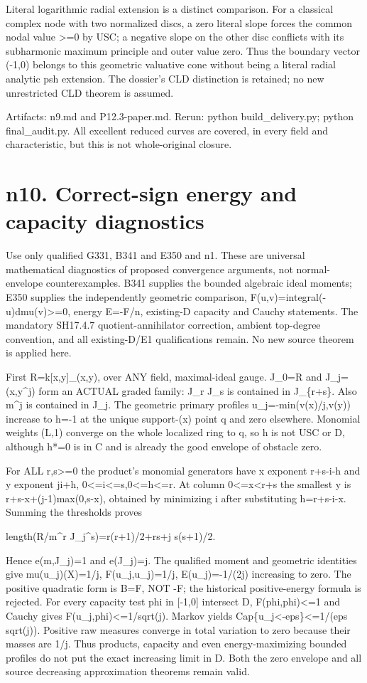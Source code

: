 \documentclass[11pt]{article}
\begin{document}
Literal logarithmic radial extension is a distinct comparison. For a classical complex node with two normalized discs, a zero literal slope forces the common nodal value >=0 by USC; a negative slope on the other disc conflicts with its subharmonic maximum principle and outer value zero. Thus the boundary vector (-1,0) belongs to this geometric valuative cone without being a literal radial analytic psh extension. The dossier's CLD distinction is retained; no new unrestricted CLD theorem is assumed.

Artifacts: n9.md and P12.3-paper.md. Rerun: python build\_delivery.py; python final\_audit.py. All excellent reduced curves are covered, in every field and characteristic, but this is not whole-original closure.


\section*{n10. Correct-sign energy and capacity diagnostics}

Use only qualified G331, B341 and E350 and n1. These are universal mathematical diagnostics of proposed convergence arguments, not normal-envelope counterexamples. B341 supplies the bounded algebraic ideal moments; E350 supplies the independently geometric comparison, F(u,v)=integral(-u)dmu(v)>=0, energy E=-F/n, existing-D capacity and Cauchy statements. The mandatory SH17.4.7 quotient-annihilator correction, ambient top-degree convention, and all existing-D/E1 qualifications remain. No new source theorem is applied here.

First R=k[x,y]\_(x,y), over ANY field, maximal-ideal gauge. J\_0=R and J\_j=(x,y\textasciicircum{}j) form an ACTUAL graded family: J\_r J\_s is contained in J\_\{r+s\}. Also m\textasciicircum{}j is contained in J\_j. The geometric primary profiles u\_j=-min(v(x)/j,v(y)) increase to h=-1 at the unique support-(x) point q and zero elsewhere. Monomial weights (L,1) converge on the whole localized ring to q, so h is not USC or D, although h*=0 is in C and is already the good envelope of obstacle zero.

For ALL r,s>=0 the product's monomial generators have x exponent r+s-i-h and y exponent ji+h, 0<=i<=s,0<=h<=r. At column 0<=x<r+s the smallest y is r+s-x+(j-1)max(0,s-x), obtained by minimizing i after substituting h=r+s-i-x. Summing the thresholds proves

    length(R/m\textasciicircum{}r J\_j\textasciicircum{}s)=r(r+1)/2+rs+j s(s+1)/2.

Hence e(m,J\_j)=1 and e(J\_j)=j. The qualified moment and geometric identities give mu(u\_j)(X)=1/j, F(u\_j,u\_j)=1/j, E(u\_j)=-1/(2j) increasing to zero. The positive quadratic form is B=F, NOT -F; the historical positive-energy formula is rejected. For every capacity test phi in [-1,0] intersect D, F(phi,phi)<=1 and Cauchy gives F(u\_j,phi)<=1/sqrt(j). Markov yields Cap\{u\_j<-eps\}<=1/(eps sqrt(j)). Positive raw measures converge in total variation to zero because their masses are 1/j. Thus products, capacity and even energy-maximizing bounded profiles do not put the exact increasing limit in D. Both the zero envelope and all source decreasing approximation theorems remain valid.
\end{document}
